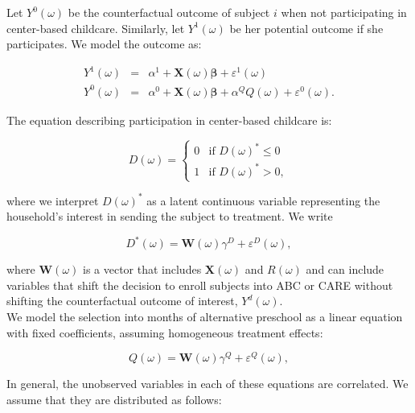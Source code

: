 \begin{appendices}
\noindent Let $Y^{0}(\omega)$ be the counterfactual outcome of subject $i$ when not participating in center-based childcare. Similarly, let $Y^{1}(\omega)$ be her potential outcome if she participates. We model the outcome as:

\begin{eqnarray}
Y^1(\omega) &=& \alpha^1+\mathbf{X}(\omega) \mathbf{\beta}                 +\varepsilon^1(\omega) \nonumber  \\
Y^0(\omega) &=& \alpha^0+\mathbf{X}(\omega) \mathbf{\beta} + \alpha^Q Q(\omega)+\varepsilon^0(\omega).  \label{eq:potout}
\end{eqnarray}

\noindent The equation describing participation in center-based childcare is:

\begin{equation}
D(\omega) = \left\{
        \begin{array}{ll}
        	0 &\text{if } D(\omega)^* \leq  0 \\
            1 &\text{if } D(\omega)^* > 0, \label{eq:sel1}
        \end{array}
    \right.
\end{equation}

\noindent where we interpret $D(\omega)^*$ as a latent continuous variable representing the household's interest in sending the subject to treatment. We write

\begin{equation}
D^{*}(\omega) = \mathbf{W}(\omega) \gamma^{D} + \varepsilon^{D}(\omega), \label{eq:probitD}
\end{equation}

\noindent where $\mathbf{W}(\omega)$ is a vector that includes $\mathbf{X}(\omega)$ and $R(\omega)$ and can include variables that shift the decision to enroll subjects into ABC or CARE without shifting the counterfactual outcome of interest, $Y^{d}(\omega)$. \\

\noindent We model the selection into months of alternative preschool as a linear equation with fixed coefficients, assuming homogeneous treatment effects:

\begin{equation}
Q(\omega) = \mathbf{W}(\omega) \gamma^{Q} + \varepsilon^{Q}(\omega), \label{eq:selq}
\end{equation}

\noindent In general, the unobserved variables in each of these equations are correlated. We assume that they are distributed as follows:


\end{appendices}
